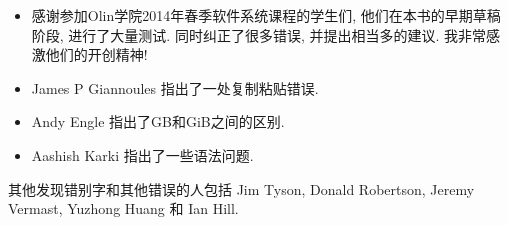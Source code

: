 \documentclass[12pt]{book}
\begin{document}
\small

\begin{itemize}
\item 感谢参加Olin学院2014年春季软件系统课程的学生们,
他们在本书的早期草稿阶段, 进行了大量测试.
同时纠正了很多错误, 并提出相当多的建议. 
我非常感激他们的开创精神!

\item James P Giannoules 指出了一处复制粘贴错误.

\item Andy Engle 指出了GB和GiB之间的区别.

\item Aashish Karki 指出了一些语法问题.


\end{itemize}
其他发现错别字和其他错误的人包括
Jim Tyson, Donald Robertson, Jeremy Vermast, Yuzhong Huang 和 Ian Hill.

\normalsize

\clearemptydoublepage


\tableofcontents

\clearemptydoublepage
\end{document}
